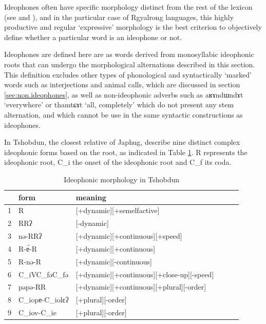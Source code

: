 \documentclass[oldfontcommands,oneside,a4paper,11pt]{article}
\newcommand{\ipa}[1]{{\phon \mbox{#1}}} %
\begin{document}
Ideophones often have specific morphology distinct from the rest of the lexicon (see   \citealt{diffloth76expressives} and  \citealt{zwicky87expressive}), and in the particular case of Rgyalrong languages, this highly productive and regular  `expressive' morphology is the best criterion to objectively define whether a particular word is an ideophone or not. 

Ideophones are defined here are as words derived from monosyllabic ideophonic roots that can undergo the morphological alternations described in this section. This definition excludes other types of phonological and syntactically `marked' words such as interjections and animal calls, which are discussed in section \ref{sec:non.ideophones}, as well as non-ideophonic adverbs such as \ipa{aʁɤndɯndɤt} `everywhere' or \ipa{thamtɕɤt} `all, completely' which do not present any stem alternation, and which cannot be use in the same syntactic constructions as ideophones.
 

 In Tshobdun, the closest relative of Japhug, \citet[3-4]{jackson04zhuangmaoci} describe nine distinct complex ideophonic forms based on the root, as indicated in Table \ref{tab:tshobdun1}. R represents the ideophonic root, C_i the onset of the ideophonic root and C_f its coda. 

\begin{table}[h]
\caption{Ideophonic morphology in Tshobdun} \label{tab:tshobdun1}
\begin{tabular}{llllll}
\toprule
&form & meaning  \\
\midrule
1 & R& 	 [+dynamic][+semelfactive]\\
2&RR\ipa{ʔ} & [-dynamic]  \\
3&\ipa{nə}-RR\ipa{ʔ} & [+dynamic][+continuous][+speed]  \\
4&R-\ipa{ɐ́}-R & [+dynamic][+continuous]   \\
5&R-\ipa{nə}-R & [+dynamic][-continuous] \\
6&C_iVC_f\ipa{ə}C_f\ipa{ə}  & [+dynamic][+continuous][+close-up][-speed] \\
7&\ipa{pəpə}-RR & [+dynamic][+continuous][+plural][-order]   \\
8& C_i\ipa{opɐ}-C_i\ipa{olɛʔ}&[+plural][-order]   \\
9& C_i\ipa{ov}-C_i\ipa{e}&[+plural][-order]   \\
\bottomrule
\end{tabular}
\end{table}

\end{document}

